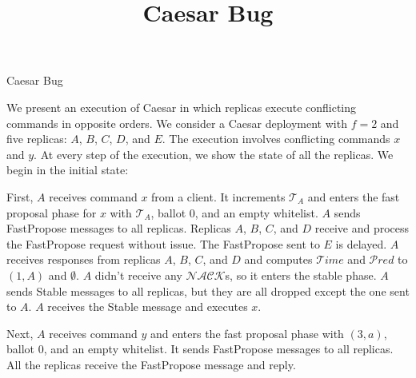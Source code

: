 \documentclass{mwhittaker}
\title{Caesar Bug}
\newcommand{\Time}{\mathcal{T}}
\newcommand{\Pred}{\mathcal{P}red}
\newcommand{\Nack}{\mathcal{NACK}}
\begin{document}
\begin{center}
  \Large Caesar Bug
\end{center}

We present an execution of Caesar in which replicas execute conflicting
commands in opposite orders. We consider a Caesar deployment with $f = 2$ and
five replicas: $A$, $B$, $C$, $D$, and $E$. The execution involves conflicting
commands $x$ and $y$. At every step of the execution, we show the state of all
the replicas. We begin in the initial state:

{}

First, $A$ receives command $x$ from a client. It increments $\Time_A$ and
enters the fast proposal phase for $x$ with $\Time_A$, ballot $0$, and an empty
whitelist. $A$ sends FastPropose messages to all replicas. Replicas $A$, $B$,
$C$, and $D$ receive and process the FastPropose request without issue. The
FastPropose sent to $E$ is delayed. $A$ receives responses from replicas $A$,
$B$, $C$, and $D$ and computes $\Time{}ime$ and $\Pred$ to $(1, A)$ and
$\emptyset$. $A$ didn't receive any $\Nack$s, so it enters the stable phase.
$A$ sends Stable messages to all replicas, but they are all dropped except the
one sent to $A$. $A$ receives the Stable message and executes $x$.

{}

Next, $A$ receives command $y$ and enters the fast proposal phase with $(3,
a)$, ballot $0$, and an empty whitelist. It sends FastPropose messages to all
replicas. All the replicas receive the FastPropose message and reply.

{}



\end{document}
